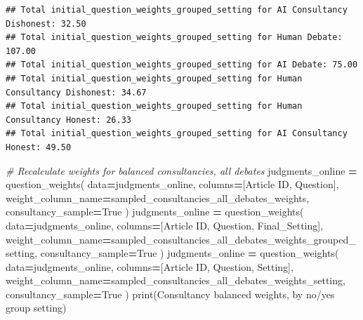 \documentclass[
]{article}
\newenvironment{Shaded}{\begin{snugshade}}{\end{snugshade}}
\newcommand{\BuiltInTok}[1]{#1}
\newcommand{\CommentTok}[1]{\textcolor[rgb]{0.56,0.35,0.01}{\textit{#1}}}
\newcommand{\NormalTok}[1]{#1}
\newcommand{\OperatorTok}[1]{\textcolor[rgb]{0.81,0.36,0.00}{\textbf{#1}}}
\newcommand{\StringTok}[1]{\textcolor[rgb]{0.31,0.60,0.02}{#1}}
\newcommand{\VariableTok}[1]{\textcolor[rgb]{0.00,0.00,0.00}{#1}}
\begin{document}
\begin{verbatim}
## Total initial_question_weights_grouped_setting for AI Consultancy Dishonest: 32.50
## Total initial_question_weights_grouped_setting for Human Debate: 107.00
## Total initial_question_weights_grouped_setting for AI Debate: 75.00
## Total initial_question_weights_grouped_setting for Human Consultancy Dishonest: 34.67
## Total initial_question_weights_grouped_setting for Human Consultancy Honest: 26.33
## Total initial_question_weights_grouped_setting for AI Consultancy Honest: 49.50
\end{verbatim}

\begin{Shaded}
\begin{Highlighting}[]
\CommentTok{\# Recalculate weights for balanced consultancies, all debates}
\NormalTok{judgments\_online }\OperatorTok{=}\NormalTok{ question\_weights(}
\NormalTok{    data}\OperatorTok{=}\NormalTok{judgments\_online, }
\NormalTok{    columns}\OperatorTok{=}\NormalTok{[}\StringTok{\textquotesingle{}Article ID\textquotesingle{}}\NormalTok{, }\StringTok{\textquotesingle{}Question\textquotesingle{}}\NormalTok{], }
\NormalTok{    weight\_column\_name}\OperatorTok{=}\StringTok{\textquotesingle{}sampled\_consultancies\_all\_debates\_weights\textquotesingle{}}\NormalTok{,}
\NormalTok{    consultancy\_sample}\OperatorTok{=}\VariableTok{True}
\NormalTok{)}
\NormalTok{judgments\_online }\OperatorTok{=}\NormalTok{ question\_weights(}
\NormalTok{    data}\OperatorTok{=}\NormalTok{judgments\_online, }
\NormalTok{    columns}\OperatorTok{=}\NormalTok{[}\StringTok{\textquotesingle{}Article ID\textquotesingle{}}\NormalTok{, }\StringTok{\textquotesingle{}Question\textquotesingle{}}\NormalTok{, }\StringTok{\textquotesingle{}Final\_Setting\textquotesingle{}}\NormalTok{], }
\NormalTok{    weight\_column\_name}\OperatorTok{=}\StringTok{\textquotesingle{}sampled\_consultancies\_all\_debates\_weights\_grouped\_setting\textquotesingle{}}\NormalTok{,}
\NormalTok{    consultancy\_sample}\OperatorTok{=}\VariableTok{True}
\NormalTok{)}
\NormalTok{judgments\_online }\OperatorTok{=}\NormalTok{ question\_weights(}
\NormalTok{    data}\OperatorTok{=}\NormalTok{judgments\_online, }
\NormalTok{    columns}\OperatorTok{=}\NormalTok{[}\StringTok{\textquotesingle{}Article ID\textquotesingle{}}\NormalTok{, }\StringTok{\textquotesingle{}Question\textquotesingle{}}\NormalTok{, }\StringTok{\textquotesingle{}Setting\textquotesingle{}}\NormalTok{], }
\NormalTok{    weight\_column\_name}\OperatorTok{=}\StringTok{\textquotesingle{}sampled\_consultancies\_all\_debates\_weights\_setting\textquotesingle{}}\NormalTok{,}
\NormalTok{    consultancy\_sample}\OperatorTok{=}\VariableTok{True}
\NormalTok{)}
\BuiltInTok{print}\NormalTok{(}\StringTok{\textquotesingle{}Consultancy balanced weights, by no/yes group setting\textquotesingle{}}\NormalTok{)}
\end{Highlighting}
\end{Shaded}
\end{document}
